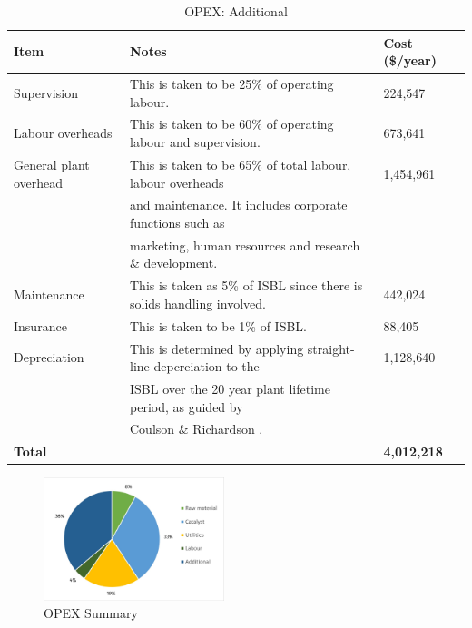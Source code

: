 \begin{table}[H]
\centering
\caption{OPEX: Additional}
\label{tab:opex-add}
\begin{tabular}{l|ll}
\toprule
\textbf{Item}          & \textbf{Notes}                                                          & \textbf{Cost (\$/year)} \\
\midrule
Supervision            & This is taken to be 25\% of operating labour.                           & 224,547                 \\
Labour overheads       & This is taken to be 60\% of operating labour and supervision.           & 673,641                 \\
General plant overhead & This is taken to be 65\% of total labour, labour overheads              & 1,454,961               \\
                       & and maintenance. It includes corporate functions such as                &                         \\
                       & marketing, human resources and research \& development.                 &                         \\
Maintenance            & This is taken as 5\% of ISBL since there is solids handling   involved. & 442,024                 \\
Insurance              & This is taken to be 1\% of ISBL.                                        & 88,405                  \\
Depreciation           & This is determined by applying straight-line depcreiation to the        & 1,128,640               \\
                       & ISBL over the 20 year plant lifetime period, as guided by               &                         \\
                       & Coulson \& Richardson \cite{sinnott_coulson_2005}.                                             &                         \\
\textbf{Total}         & \textbf{}                                                               & \textbf{4,012,218}
\\\bottomrule
\end{tabular}
\end{table}

\begin{figure}
    \caption{OPEX Summary}
    \label{fig:OPEXSummary}
    \includegraphics[width=0.47\textwidth]{chapters/6-economics/figures/OPEX_summary.jpg}
\end{figure}

